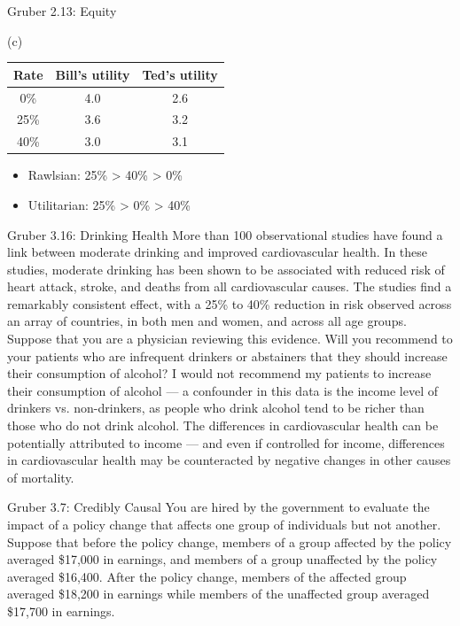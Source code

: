 \documentclass[10pt]{extarticle}
\begin{document}
{\begin{problem}{Gruber 2.13: Equity}
\begin{problem}{(c)}
      \begin{center}
        \begin{tabular}{c|c|c}
          Rate & Bill's utility & Ted's utility\\
          \hline
          0\% & 4.0 & 2.6\\
          25\% & 3.6 & 3.2\\
          40\% & 3.0 & 3.1
        \end{tabular}
      \end{center}
      \begin{itemize}
        \item Rawlsian: 25\% > 40\% > 0\%
        \item Utilitarian: 25\% > 0\% > 40\%
      \end{itemize}
    \end{problem}
  \end{problem}
  \begin{problem}{Gruber 3.16: Drinking Health}
    More than 100 observational studies have found a link between moderate drinking and improved cardiovascular health. In these studies, moderate drinking has been shown to be associated with reduced risk of heart attack, stroke, and deaths from all cardiovascular causes. The studies find a remarkably consistent effect, with a 25\% to 40\% reduction in risk observed across an array of countries, in both men and women, and across all age groups. Suppose that you are a physician reviewing this evidence. Will you recommend to your patients who are infrequent drinkers or abstainers that they should increase their consumption of alcohol?
    \tcblower
    I would not recommend my patients to increase their consumption of alcohol --- a confounder in this data is the income level of drinkers vs. non-drinkers, as people who drink alcohol tend to be richer than those who do not drink alcohol. The differences in cardiovascular health can be potentially attributed to income --- and even if controlled for income, differences in cardiovascular health may be counteracted by negative changes in other causes of mortality.
  \end{problem}
  \begin{problem}{Gruber 3.7: Credibly Causal}
    You are hired by the government to evaluate the impact of a policy change that affects one group of individuals but not another. Suppose that before the policy change, members of a group affected by the policy averaged \$17,000 in earnings, and members of a group unaffected by the policy averaged \$16,400. After the policy change, members of the affected group averaged \$18,200 in earnings while members of the unaffected group averaged \$17,700 in earnings.

\end{problem}}
\end{document}
